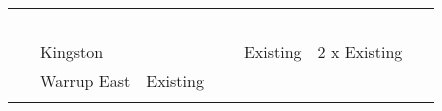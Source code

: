 \documentclass[version=last,
    paper=a4,                               %
    10pt,                                   %
    dvipsnames,
    oneside,                              %
    headings=openany,                       %
    open=any,
    BCOR=7mm,                               %
    DIV=15,     %
]{scrbook}
\begin{document}
\begin{longtable}[c]{@{}lllllll@{}}
\begin{minipage}[t]{0.12\columnwidth}
~
\end{minipage} & \begin{minipage}[t]{0.12\columnwidth}\raggedright
~
\end{minipage} & \begin{minipage}[t]{0.12\columnwidth}\raggedright
~
\end{minipage}
\\\addlinespace
\begin{minipage}[t]{0.12\columnwidth}\raggedright
~
\end{minipage} & \begin{minipage}[t]{0.12\columnwidth}\raggedright
Kingston
\end{minipage} & \begin{minipage}[t]{0.12\columnwidth}\raggedright
~
\end{minipage} & \begin{minipage}[t]{0.12\columnwidth}\raggedright
~
\end{minipage} & \begin{minipage}[t]{0.12\columnwidth}\raggedright
Existing
\end{minipage} & \begin{minipage}[t]{0.12\columnwidth}\raggedright
2 x Existing
\end{minipage} & \begin{minipage}[t]{0.12\columnwidth}\raggedright
~
\end{minipage}
\\\addlinespace
\begin{minipage}[t]{0.12\columnwidth}\raggedright
~
\end{minipage} & \begin{minipage}[t]{0.12\columnwidth}\raggedright
Warrup East
\end{minipage} & \begin{minipage}[t]{0.12\columnwidth}\raggedright
Existing
\end{minipage} & \begin{minipage}[t]{0.12\columnwidth}\raggedright
~
\end{minipage} & \begin{minipage}[t]{0.12\columnwidth}\raggedright
~
\end{minipage} & \begin{minipage}[t]{0.12\columnwidth}\raggedright
~
\end{minipage} & \begin{minipage}[t]{0.12\columnwidth}\raggedright
~
\end{minipage}
\\\addlinespace

\end{longtable}
\end{document}
